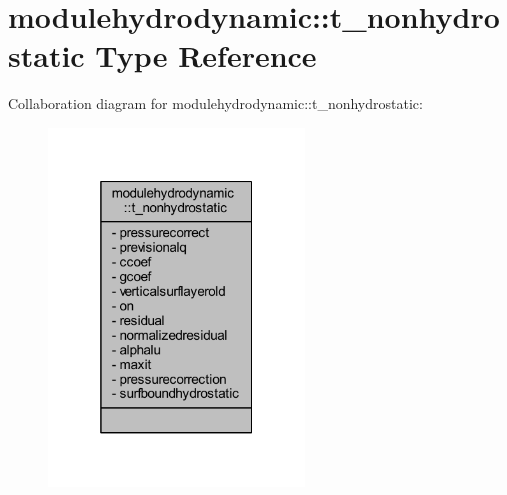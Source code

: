 \hypertarget{structmodulehydrodynamic_1_1t__nonhydrostatic}{}\section{modulehydrodynamic\+:\+:t\+\_\+nonhydrostatic Type Reference}
\label{structmodulehydrodynamic_1_1t__nonhydrostatic}


Collaboration diagram for modulehydrodynamic\+:\+:t\+\_\+nonhydrostatic\+:\nopagebreak
\begin{figure}[H]
\begin{center}
\leavevmode
\includegraphics[width=193pt]{structmodulehydrodynamic_1_1t__nonhydrostatic__coll__graph}
\end{center}
\end{figure}
